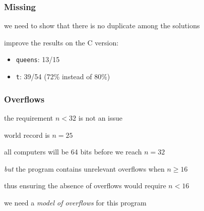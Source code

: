 \documentclass[handout,compress]{beamer}
\begin{document}
\begin{frame}
  \frametitle{Missing}

  we need to show that there is no duplicate among the solutions

  \Pause
  improve the results on the C version:
  \begin{itemize}
  \item \texttt{queens}: 13/15
  \item \texttt{t}: 39/54 (72\% instead of 80\%)
  \end{itemize}
\end{frame}

\begin{frame}
  \frametitle{Overflows}
  the requirement $n<32$ is not an issue

  world record is $n=25$ 

  all computers will be 64 bits before we reach $n=32$

  \Pause
  \emph{but} the program contains unrelevant overflows when $n\ge 16$

  thus ensuring the absence of overflows would require $n<16$

  we need a \emph{model of overflows} for this program
\end{frame}
\end{document}
